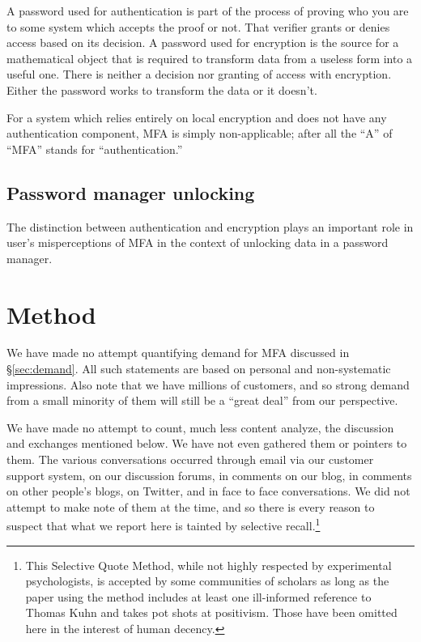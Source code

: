 \documentclass[12pt]{article}
\begin{document}
A password used for authentication is part of the process of proving who you are to some system which accepts the proof or not. That verifier grants or denies access based on its decision. A password used for encryption is the source for a mathematical object that is required to transform data from a useless form into a useful one. There is neither a decision nor granting of access with encryption. Either the password works to transform the data or it doesn't.

For a system which relies entirely on local encryption and does not have any authentication component, MFA is simply non-applicable;
after all the “A” of “MFA” stands for “authentication.” 

\subsection{Password manager unlocking}

The distinction between authentication and encryption plays an important role in user's misperceptions of MFA in the context of unlocking data in a password manager. 

\section{Method}

We have made no attempt quantifying demand for MFA discussed in \S\ref{sec:demand}.
All such statements are based on personal and non-systematic impressions.
Also note that we have millions of customers,
and so strong demand from a small minority of them will still be a “great deal” from our perspective.

We have made no attempt to count, much less content analyze, the discussion and exchanges mentioned below.
We have not even gathered them or pointers to them.
The various conversations occurred
through email via our customer support system,
on our discussion forums,
in comments on our blog,
in comments on other people's blogs,
on Twitter,
and in face to face conversations. 
We did not attempt to make note of them at the time,
and so there is every reason to suspect that what we report here is tainted by selective recall.\footnote
  {This Selective Quote Method,
  while not highly respected by experimental psychologists,
  is accepted by some communities of scholars
  as long as the paper using the method includes
  at least one ill-informed reference to Thomas Kuhn
  and takes pot shots at positivism.
  Those have been omitted here in the interest of human decency.}
\end{document}
